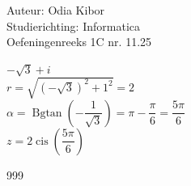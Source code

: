 \documentclass[a4paper]{article}
\begin{document}
  
\noindent \large Auteur: Odia Kibor \\
\noindent \large Studierichting: Informatica\\
\noindent \large Oefeningenreeks 1C nr. 11.25\\

\medskip

\normalsize

$-\sqrt{3} + i$\\

$r = \sqrt{(-\sqrt{3})^2 + 1^2} = 2$\\

$\alpha = \operatorname{Bgtan}\left (-\dfrac{1}{\sqrt{3}} \right) = \pi - \dfrac{\pi}{6} = \dfrac{5\pi}{6}$\\

$z = 2 \operatorname{cis} \left(\dfrac{5\pi}{6} \right)$









\begin{thebibliography}{999}
\end{thebibliography}
\end{document}
